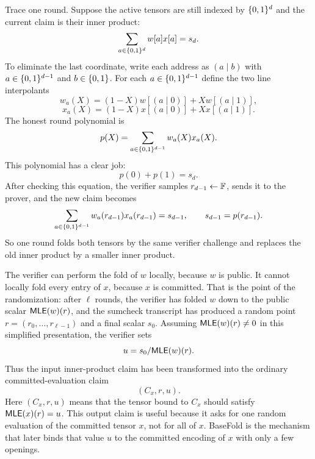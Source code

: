 Trace one round.  Suppose the active tensors are still indexed by $\{0,1\}^d$ and
the current claim is their inner product:
\[
  \sum_{a\in\{0,1\}^d} w[a]x[a]=s_d.
\]
To eliminate the last coordinate, write each address as $(a\mid b)$ with
$a\in\{0,1\}^{d-1}$ and $b\in\{0,1\}$.  For each $a\in\{0,1\}^{d-1}$ define the two line
interpolants
\[
  w_a(X)=(1-X)w[(a\mid0)]+Xw[(a\mid1)],
\]
\[
  x_a(X)=(1-X)x[(a\mid0)]+Xx[(a\mid1)].
\]
The honest round polynomial is
\[
  p(X)=\sum_{a\in\{0,1\}^{d-1}}w_a(X)x_a(X).
\]
This polynomial has a clear job:
\[
  p(0)+p(1)=s_d.
\]
After checking this equation, the verifier samples $r_{d-1}\leftarrow\mathbb{F}$, sends
it to the prover, and
the new claim becomes
\[
  \sum_{a\in\{0,1\}^{d-1}} w_a(r_{d-1})x_a(r_{d-1})=s_{d-1},
  \qquad s_{d-1}=p(r_{d-1}).
\]
So one round folds both tensors by the same verifier challenge and replaces the
old inner product by a smaller inner product.

The verifier can perform the fold of $w$ locally, because $w$ is public.  It
cannot locally fold every entry of $x$, because $x$ is committed.  That is the
point of the randomization: after $\ell$ rounds, the verifier has folded $w$
down to the public scalar $\mathsf{MLE}(w)(r)$, and the sumcheck transcript has
produced a random point $r=(r_0,\ldots,r_{\ell-1})$ and a final scalar $s_0$.
Assuming $\mathsf{MLE}(w)(r)\ne0$ in this simplified presentation, the verifier sets
\[
  u=s_0/\mathsf{MLE}(w)(r).
\]
Thus the input inner-product claim has been transformed into the ordinary
committed-evaluation claim
\[
  (C_x,r,u).
\]
Here $(C_x,r,u)$ means that the tensor bound to $C_x$ should satisfy
$\mathsf{MLE}(x)(r)=u$.  This output claim is useful because it asks for one random
evaluation of the committed tensor $x$, not for all of $x$.  BaseFold is the
mechanism that later binds that value $u$ to the committed encoding of $x$ with
only a few openings.
